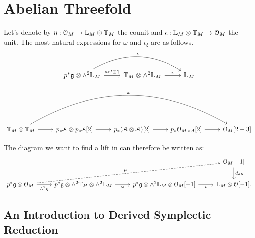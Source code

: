\chapter{Abelian Threefold}

Let's denote by $\eta : \mathcal{O}_M \to \mathbb L_M \otimes \mathbb T_M$ the counit and $\epsilon : \mathbb L_M \otimes \mathbb T_M \to \mathcal{O}_M$
the unit.
The most natural expressions for $\omega$ and $\iota_{\xi}$ are as follows.
\[
\begin{tikzcd}
p^*\fr g \otimes \wedge^2 \bbL_M \arrow{r}{act \otimes 1} \arrow[bend left]{rr}{\iota} &
\bbT_M \otimes \wedge^2 \bbL_M\arrow{r}{\epsilon} & \bbL_M
\end{tikzcd}
\]
\[
\begin{tikzcd}
\bbT_M\otimes \bbT_M \arrow{r}\arrow[bend left]{rrrr}{\omega} & p_*\mathcal{A} \otimes p_*\mathcal{A}[2] \arrow{r} & 
p_*(\mathcal{A}\otimes \mathcal{A})[2]
\arrow{r} & p_*\mathcal{O}_{M \times A}[2] \arrow{r} & \mathcal{O}_M[2-3]
\end{tikzcd}
\]

The diagram we want to find a lift in can therefore be written as:
\[
\begin{tikzcd}
\; & & & \mathcal{O}_M[-1]\arrow{d}{d_{dR}} \\
p^* \fr g \otimes \mathcal{O}_M \arrow[swap]{r}{\wedge^2 \eta}\arrow[dashed]{urrr}{\mu} & 
p^* \fr g \otimes \wedge^2 \bbT_M \otimes \wedge^2 \bbL_M \arrow[swap]{r}{\omega} &
p^* \fr g \otimes \wedge^2 \bbL_M \otimes \mathcal{O}_M[-1]\arrow[swap]{r}{\iota} & \bbL_M \otimes \mathcal{O}[-1] .
\end{tikzcd}
\]


\section{An Introduction to Derived Symplectic Reduction}